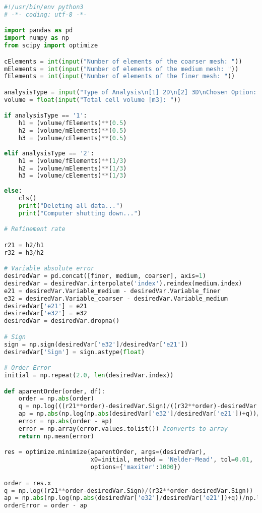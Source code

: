 \begin{lstlisting}[language=python]
#!/usr/bin/env python3
# -*- coding: utf-8 -*-

import pandas as pd
import numpy as np
from scipy import optimize

cElements = int(input("Number of elements of the coarser mesh: "))
mElements = int(input("Number of elements of the medium mesh: "))
fElements = int(input("Number of elements of the finer mesh: "))

analysisType = input("Type of Analysis\n[1] 2D\n[2] 3D\nChosen Option: ")
volume = float(input("Total cell volume [m3]: "))

if analysisType == '1':
	h1 = (volume/fElements)**(0.5)
	h2 = (volume/mElements)**(0.5)
	h3 = (volume/cElements)**(0.5)
	
elif analysisType == '2':
	h1 = (volume/fElements)**(1/3)
	h2 = (volume/mElements)**(1/3)
	h3 = (volume/cElements)**(1/3)
	
else:
	cls()
	print("Deleting all data...")
	print("Computer shutting down...")

# Refinement rate

r21 = h2/h1
r32 = h3/h2

# Variable absolute error
desiredVar = pd.concat([finer, medium, coarser], axis=1)
desiredVar = desiredVar.interpolate('index').reindex(medium.index)
e21 = desiredVar.Variable_medium - desiredVar.Variable_finer
e32 = desiredVar.Variable_coarser - desiredVar.Variable_medium
desiredVar['e21'] = e21
desiredVar['e32'] = e32
desiredVar = desiredVar.dropna()

# Sign
sign = np.sign(desiredVar['e32']/desiredVar['e21'])
desiredVar['Sign'] = sign.astype(float)

# Order Error
initial = np.repeat(2.0, len(desiredVar.index))

def aparentOrder(order, df):
    order = np.abs(order)
    q = np.log(((r21**order)-desiredVar.Sign)/((r32**order)-desiredVar.Sign))
    ap = np.abs(np.log(np.abs(desiredVar['e32']/desiredVar['e21'])+q))/np.log(r21)
    error = np.abs(order - ap)
    error = np.array(error.values.tolist()) #converts to array
    return np.mean(error)

res = optimize.minimize(aparentOrder, args=(desiredVar),
                        x0=initial, method = 'Nelder-Mead', tol=0.01,
                        options={'maxiter':1000})

order = res.x
q = np.log((r21**order-desiredVar.Sign)/(r32**order-desiredVar.Sign))
ap = np.abs(np.log(np.abs(desiredVar['e32']/desiredVar['e21'])+q))/np.log(r21)
orderError = order - ap


\end{lstlisting}
